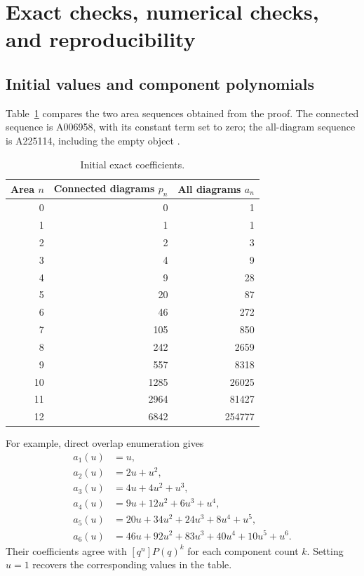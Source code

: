 \documentclass[11pt,letterpaper]{article}
\numberwithin{equation}{section}
\theoremstyle{definition}
\begin{document}
\section{Exact checks, numerical checks, and reproducibility}
\label{sec:verification}

\subsection{Initial values and component polynomials}
Table~\ref{tab:initial} compares the two area sequences obtained from the
proof. The connected sequence is A006958, with its constant term set to
zero; the all-diagram sequence is A225114, including the empty object
\cite{oeis006958,oeis225114}.

\begin{table}[htbp]
\centering
\begin{tabular}{@{}r r r@{}}
\toprule
Area $n$ & Connected diagrams $p_n$ & All diagrams $a_n$\\
\midrule
0 & 0 & 1\\
1 & 1 & 1\\
2 & 2 & 3\\
3 & 4 & 9\\
4 & 9 & 28\\
5 & 20 & 87\\
6 & 46 & 272\\
7 & 105 & 850\\
8 & 242 & 2659\\
9 & 557 & 8318\\
10 & 1285 & 26025\\
11 & 2964 & 81427\\
12 & 6842 & 254777\\
\bottomrule
\end{tabular}
\caption{Initial exact coefficients.}\label{tab:initial}
\end{table}

For example, direct overlap enumeration gives
\begin{align*}
 a_1(u)&=u,\\
 a_2(u)&=2u+u^2,\\
 a_3(u)&=4u+4u^2+u^3,\\
 a_4(u)&=9u+12u^2+6u^3+u^4,\\
 a_5(u)&=20u+34u^2+24u^3+8u^4+u^5,\\
 a_6(u)&=46u+92u^2+83u^3+40u^4+10u^5+u^6.
\end{align*}
Their coefficients agree with $[q^n]P(q)^k$ for each component count $k$.
Setting $u=1$ recovers the corresponding values in the table.
\end{document}
